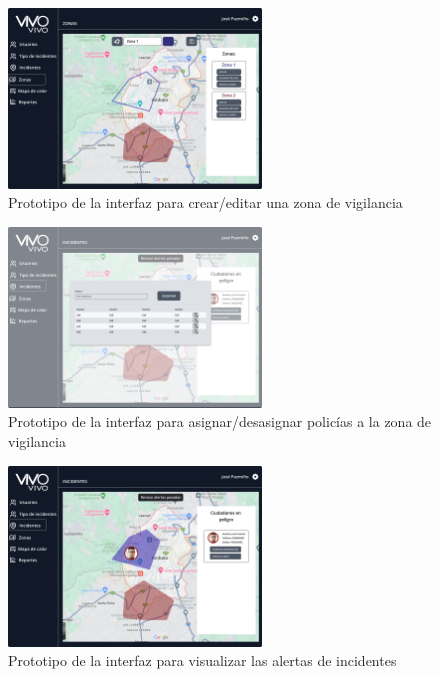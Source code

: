 \begin{figure}[H]
      \centering
      \includegraphics[width=0.6\textwidth]{chapters/III-resultados-y-discusion/resources/images/prototipo-formulario-zona-vigilancia-web.png}
      \caption{Prototipo de la interfaz para crear/editar una zona de vigilancia}
      \label{fig:prototipo-interfaz-usuario-web-6}
\end{figure}

\begin{figure}[H]
      \centering
      \includegraphics[width=0.6\textwidth]{chapters/III-resultados-y-discusion/resources/images/prototipo-asignar-policias-zona-vigilancia.png}
      \caption{Prototipo de la interfaz para asignar/desasignar policías a la zona de vigilancia}
      \label{fig:prototipo-interfaz-usuario-web-7}
\end{figure}

\begin{figure}[H]
      \centering
      \includegraphics[width=0.6\textwidth]{chapters/III-resultados-y-discusion/resources/images/prototipo-mapa-incidentes-web.png}
      \caption{Prototipo de la interfaz para visualizar las alertas de incidentes}
      \label{fig:prototipo-interfaz-usuario-web-8}
\end{figure}

